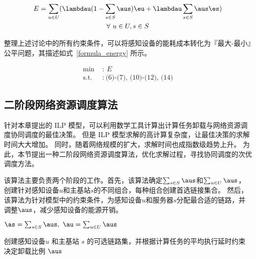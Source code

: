 \begin{equation}
\label{formula_Energy}
\begin{gathered}
E = \sum\limits_{u\in U}(\lambdau(1-\sum\limits_{s\in S}\aus)\eu + \lambdau\sum\limits_{s\in S}\aus\es)\\
\forall\ u \in U, s \in S\\
\end{gathered}
\end{equation}

整理上述讨论中的所有约束条件，可以将感知设备的能耗成本转化为『最大-最小』公平问题，其描述如式~\eqref{formula_energy} 所示。

\begin{equation}
\label{formula_energy}
\begin{aligned}
\text{min }&{:}\ E\\
\text{s.t. }&{:}\ \text{(6)-(7), (10)-(12), (14)}
\end{aligned}
\end{equation}

\subsection{二阶段网络资源调度算法}

针对本章提出的 ILP 模型，可以利用数学工具计算出计算任务卸载与网络资源调度协同调度的最佳决策。
但是 ILP 模型求解的高计算复杂度，让最佳决策的求解时间大大增加。
同时，随着网络规模的扩大，求解时间也成指数级趋势上升。
为此，本节提出一种二阶段网络资源调度算法，优化求解过程，寻找协同调度的次优调度方法。

该算法主要负责两个阶段的工作。首先，该算法确定$\sum_{s \in S}\aus$和$\sum_{u \in U}\aus$，创建针对感知设备$u$和主基站$s$的不同组合，每种组合创建首选链接集合。
然后，该算法为针对模型中的约束条件，为感知设备$u$和服务器$s$分配最合适的链路，并调整$\aus$，减少感知设备的能源开销。

\begin{algorithm}[!b]
\setstretch{\algostretch}
$\as = \sum_{s \in S}\aus, \  \au = \sum_{u \in U}\aus$\\
\caption{创建感知设备$u$ 和主基站 $s$ 的可选链路集，并根据计算任务的平均执行延时约束决定卸载比例 $\aus$}
\label{algo_aus}
\end{algorithm}

